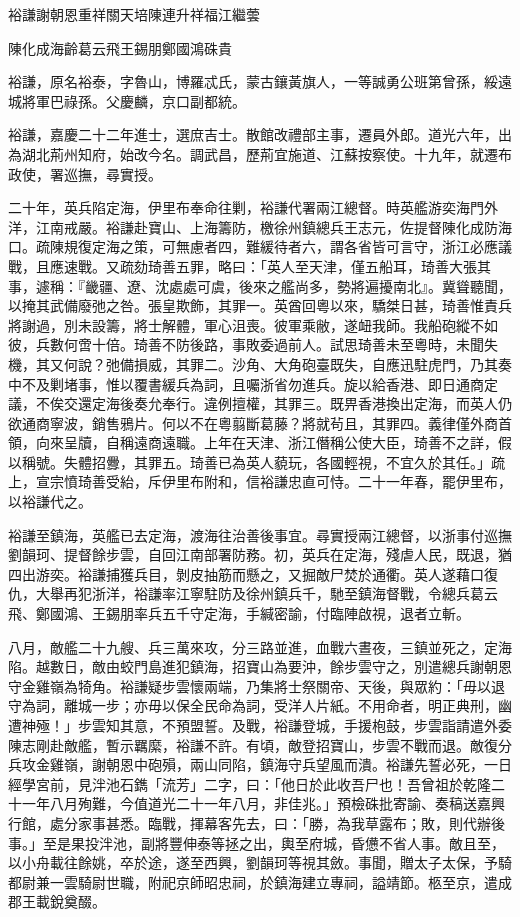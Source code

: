
\begin{pinyinscope}
裕謙謝朝恩重祥關天培陳連升祥福江繼蕓

陳化成海齡葛云飛王錫朋鄭國鴻硃貴

裕謙，原名裕泰，字魯山，博羅忒氏，蒙古鑲黃旗人，一等誠勇公班第曾孫，綏遠城將軍巴祿孫。父慶麟，京口副都統。

裕謙，嘉慶二十二年進士，選庶吉士。散館改禮部主事，遷員外郎。道光六年，出為湖北荊州知府，始改今名。調武昌，歷荊宜施道、江蘇按察使。十九年，就遷布政使，署巡撫，尋實授。

二十年，英兵陷定海，伊里布奉命往剿，裕謙代署兩江總督。時英艦游奕海門外洋，江南戒嚴。裕謙赴寶山、上海籌防，檄徐州鎮總兵王志元，佐提督陳化成防海口。疏陳規復定海之策，可無慮者四，難緩待者六，謂各省皆可言守，浙江必應議戰，且應速戰。又疏劾琦善五罪，略曰：「英人至天津，僅五船耳，琦善大張其事，遽稱：『畿疆、遼、沈處處可虞，後來之艦尚多，勢將遍擾南北』。冀聳聽聞，以掩其武備廢弛之咎。張皇欺飾，其罪一。英酋回粵以來，驕桀日甚，琦善惟責兵將謝過，別未設籌，將士解體，軍心沮喪。彼軍乘敝，遂衄我師。我船砲縱不如彼，兵數何啻十倍。琦善不防後路，事敗委過前人。試思琦善未至粵時，未聞失機，其又何說？弛備損威，其罪二。沙角、大角砲臺既失，自應迅駐虎門，乃其奏中不及剿堵事，惟以覆書緩兵為詞，且囑浙省勿進兵。旋以給香港、即日通商定議，不俟交還定海後奏允奉行。違例擅權，其罪三。既畀香港換出定海，而英人仍欲通商寧波，銷售鴉片。何以不在粵翦斷葛藤？將就茍且，其罪四。義律僅外商首領，向來呈牘，自稱遠商遠職。上年在天津、浙江僭稱公使大臣，琦善不之詳，假以稱號。失體招釁，其罪五。琦善已為英人藐玩，各國輕視，不宜久於其任。」疏上，宣宗憤琦善受紿，斥伊里布附和，信裕謙忠直可恃。二十一年春，罷伊里布，以裕謙代之。

裕謙至鎮海，英艦已去定海，渡海往治善後事宜。尋實授兩江總督，以浙事付巡撫劉韻珂、提督餘步雲，自回江南部署防務。初，英兵在定海，殘虐人民，既退，猶四出游奕。裕謙捕獲兵目，剝皮抽筋而懸之，又掘敵尸焚於通衢。英人遂藉口復仇，大舉再犯浙洋，裕謙率江寧駐防及徐州鎮兵千，馳至鎮海督戰，令總兵葛云飛、鄭國鴻、王錫朋率兵五千守定海，手緘密諭，付臨陣啟視，退者立斬。

八月，敵艦二十九艘、兵三萬來攻，分三路並進，血戰六晝夜，三鎮並死之，定海陷。越數日，敵由蛟門島進犯鎮海，招寶山為要沖，餘步雲守之，別遣總兵謝朝恩守金雞嶺為犄角。裕謙疑步雲懷兩端，乃集將士祭關帝、天後，與眾約：「毋以退守為詞，離城一步；亦毋以保全民命為詞，受洋人片紙。不用命者，明正典刑，幽遭神殛！」步雲知其意，不預盟誓。及戰，裕謙登城，手援枹鼓，步雲詣請遣外委陳志剛赴敵艦，暫示羈縻，裕謙不許。有頃，敵登招寶山，步雲不戰而退。敵復分兵攻金雞嶺，謝朝恩中砲殞，兩山同陷，鎮海守兵望風而潰。裕謙先誓必死，一日經學宮前，見泮池石鐫「流芳」二字，曰：「他日於此收吾尸也！吾曾祖於乾隆二十一年八月殉難，今值道光二十一年八月，非佳兆。」預檢硃批寄諭、奏稿送嘉興行館，處分家事甚悉。臨戰，揮幕客先去，曰：「勝，為我草露布；敗，則代辦後事。」至是果投泮池，副將豐伸泰等拯之出，輿至府城，昏憊不省人事。敵且至，以小舟載往餘姚，卒於途，遂至西興，劉韻珂等視其斂。事聞，贈太子太保，予騎都尉兼一雲騎尉世職，附祀京師昭忠祠，於鎮海建立專祠，謚靖節。柩至京，遣成郡王載銳奠醊。


\end{pinyinscope}
